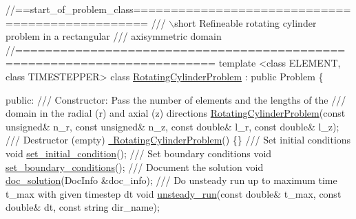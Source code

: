  
\begin{DoxyCodeInclude}
\textcolor{comment}{//==start\_of\_problem\_class================================================}
\textcolor{comment}{/// \(\backslash\)short Refineable rotating cylinder problem in a rectangular}
\textcolor{comment}{}\textcolor{comment}{/// axisymmetric domain}
\textcolor{comment}{}\textcolor{comment}{//========================================================================}
\textcolor{keyword}{template} <\textcolor{keyword}{class} ELEMENT, \textcolor{keyword}{class} TIMESTEPPER>
\textcolor{keyword}{class }\hyperlink{classRotatingCylinderProblem}{RotatingCylinderProblem} : \textcolor{keyword}{public} Problem
\{

\textcolor{keyword}{public}:
\textcolor{comment}{}
\textcolor{comment}{ /// Constructor: Pass the number of elements and the lengths of the}
\textcolor{comment}{ /// domain in the radial (r) and axial (z) directions}
\textcolor{comment}{} \hyperlink{classRotatingCylinderProblem_a436b0ff8c4ac33acfe10492c587ad80d}{RotatingCylinderProblem}(\textcolor{keyword}{const} \textcolor{keywordtype}{unsigned}& n\_r, \textcolor{keyword}{const} \textcolor{keywordtype}{unsigned}& n\_z,
                         \textcolor{keyword}{const} \textcolor{keywordtype}{double}& l\_r, \textcolor{keyword}{const} \textcolor{keywordtype}{double}& l\_z);
\textcolor{comment}{}
\textcolor{comment}{ /// Destructor (empty)}
\textcolor{comment}{} \hyperlink{classRotatingCylinderProblem_a586e71f48ee21cfc3bc93d17e91bbc11}{~RotatingCylinderProblem}() \{\}
\textcolor{comment}{}
\textcolor{comment}{ /// Set initial conditions}
\textcolor{comment}{} \textcolor{keywordtype}{void} \hyperlink{classRotatingCylinderProblem_a5e4316cce2306c4aab4a20b88cdfe6e3}{set\_initial\_condition}();
\textcolor{comment}{}
\textcolor{comment}{ /// Set boundary conditions}
\textcolor{comment}{} \textcolor{keywordtype}{void} \hyperlink{classRotatingCylinderProblem_a37efdb2d7059535a48b12f69869996ee}{set\_boundary\_conditions}();
\textcolor{comment}{}
\textcolor{comment}{ /// Document the solution}
\textcolor{comment}{} \textcolor{keywordtype}{void} \hyperlink{classRotatingCylinderProblem_a22f82fba41d68b9748642f9a29a12592}{doc\_solution}(DocInfo &doc\_info);
\textcolor{comment}{}
\textcolor{comment}{ /// Do unsteady run up to maximum time t\_max with given timestep dt}
\textcolor{comment}{} \textcolor{keywordtype}{void} \hyperlink{classRotatingCylinderProblem_abfb7f77b97e9ac061edbaa97a018cd24}{unsteady\_run}(\textcolor{keyword}{const} \textcolor{keywordtype}{double}& t\_max, \textcolor{keyword}{const} \textcolor{keywordtype}{double}& dt,
                   \textcolor{keyword}{const} \textcolor{keywordtype}{string} dir\_name);

\end{DoxyCodeInclude}


